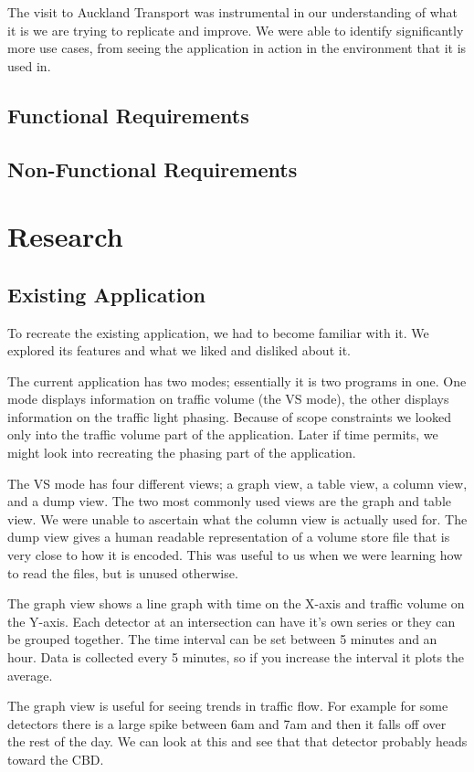 \documentclass{article}
\begin{document}
The visit to Auckland Transport was instrumental in our
understanding of what it is we are trying to replicate and
improve. We were able to identify significantly more use
cases, from seeing the application in action in the environment
that it is used in.

\subsection{Functional Requirements}
\subsection{Non-Functional Requirements}

\section{Research}
\subsection{Existing Application}
To recreate the existing application, we had to become
familiar with it. We explored its features and what we liked
and disliked about it.

The current application has two modes; essentially it is two
programs in one. One mode displays information on traffic
volume (the VS mode), the other displays information on the
traffic light phasing. Because of scope constraints we looked
only into the traffic volume part of the application. Later if
time permits, we might look into recreating the phasing part of
the application.

The VS mode has four different views; a graph view, a
table view, a column view, and a dump view. The two most
commonly used views are the graph and table view. We were
unable to ascertain what the column view is actually used for.
The dump view gives a human readable representation of a
volume store file that is very close to how it is encoded. This
was useful to us when we were learning how to read the files,
but is unused otherwise.

The graph view shows a line graph with time on the X-axis
and traffic volume on the Y-axis. Each detector at an
intersection can have it’s own series or they can be grouped
together. The time interval can be set between 5 minutes and
an hour. Data is collected every 5 minutes, so if you increase
the interval it plots the average.

The graph view is useful for seeing trends in traffic flow.
For example for some detectors there is a large spike between
6am and 7am and then it falls off over the rest of the day. We
can look at this and see that that detector probably heads
toward the CBD.
\end{document}
